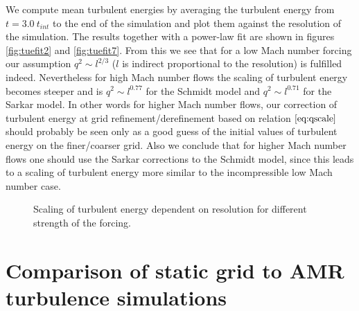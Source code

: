 We compute mean turbulent energies by
averaging the turbulent energy from $t=3.0\ t_{int}$ to the end of the
simulation
and plot them against the resolution of the simulation. The results together
with a power-law fit are shown in figures \ref{fig:tuefit2} and
\ref{fig:tuefit7}. 
From this we see that for a low Mach number forcing our assumption  
$q^2 \sim l^{2/3}$ ($l$ is indirect proportional to the resolution) is fulfilled
indeed. Nevertheless for high Mach number flows the scaling of turbulent energy
becomes steeper and is $q^2 \sim l^{0.77}$ for the Schmidt model and 
$q^2 \sim l^{0.71}$ for the Sarkar model. In other words for
higher Mach number flows, our correction of turbulent energy at grid 
refinement/derefinement based on relation $\eqref{eq:qscale}$ should probably
be seen only as a good guess of the initial values of turbulent energy on
the finer/coarser grid. Also we conclude that for higher Mach number flows one
should use the Sarkar corrections to the Schmidt model, since this leads
to a scaling of turbulent energy more similar to the incompressible low Mach
number case. 

\begin{figure}[tp]
\centering
{}
\caption{Scaling of turbulent energy dependent on resolution for different
strength of the forcing.}
\end{figure}

\section{Comparison of static grid to AMR turbulence simulations}

